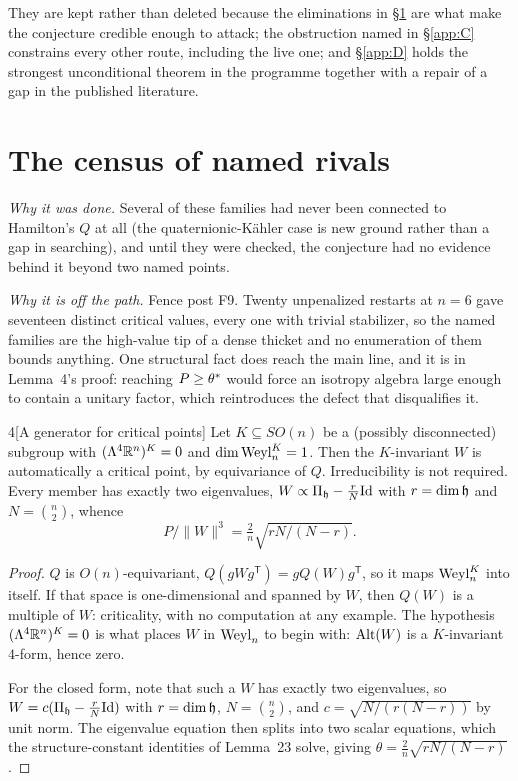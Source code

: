 They are kept rather than deleted because the eliminations in \S\ref{app:census} are what make the conjecture credible enough to attack; the obstruction named in \S\ref{app:C} constrains every other route, including the live one; and \S\ref{app:D} holds the strongest unconditional theorem in the programme together with a repair of a gap in the published literature.

\section{The census of named rivals}\label{app:census}

\emph{Why it was done.} Several of these families had never been connected to Hamilton's $Q$ at all (the quaternionic-K\"ahler case is new ground rather than a gap in searching), and until they were checked, the conjecture had no evidence behind it beyond two named points.

\emph{Why it is off the path.} Fence post F9. Twenty unpenalized restarts at $n=6$ gave seventeen distinct critical values, every one with trivial stabilizer, so the named families are the high-value tip of a dense thicket and no enumeration of them bounds anything. One structural fact does reach the main line, and it is in Lemma~4's proof: reaching $P\ge\theta^{*}$ would force an isotropy algebra large enough to contain a unitary factor, which reintroduces the defect that disqualifies it.

\begin{Lem}{4}[A generator for critical points]
Let $K\subseteq SO(n)$ be a (possibly disconnected) subgroup with $(\Lambda^4\mathbb{R}^n)^K=0$ and $\dim\mathrm{Weyl}_n^K=1$. Then the $K$-invariant $W$ is automatically a critical point, by equivariance of $Q$. Irreducibility is not required. Every member has exactly two eigenvalues, $W\propto\Pi_{\mathfrak{h}}-\tfrac rN\mathrm{Id}$ with $r=\dim\mathfrak{h}$ and $N=\binom n2$, whence
\[
P/\|W\|^3=\tfrac2n\sqrt{rN/(N-r)} .
\]
\end{Lem}

\begin{proof}
$Q$ is $O(n)$-equivariant, $Q(gWg^{\mathsf T})=gQ(W)g^{\mathsf T}$, so it maps $\mathrm{Weyl}_n^K$ into itself. If that space is one-dimensional and spanned by $W$, then $Q(W)$ is a multiple of $W$: criticality, with no computation at any example. The hypothesis $(\Lambda^4\mathbb{R}^n)^K=0$ is what places $W$ in $\mathrm{Weyl}_n$ to begin with: $\mathrm{Alt}(W)$ is a $K$-invariant $4$-form, hence zero.

For the closed form, note that such a $W$ has exactly two eigenvalues, so $W=c(\Pi_{\mathfrak{h}}-\tfrac rN\mathrm{Id})$ with $r=\dim\mathfrak{h}$, $N=\binom n2$, and $c=\sqrt{N/(r(N-r))}$ by unit norm. The eigenvalue equation then splits into two scalar equations, which the structure-constant identities of Lemma~23 solve, giving $\theta=\tfrac2n\sqrt{rN/(N-r)}$.
\end{proof}

